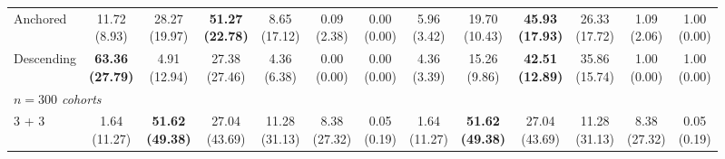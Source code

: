 {\begin{tabular}{l|cccccc|cccccc}
Anchored & \makecell{11.72 \\ (8.93)} & \makecell{28.27 \\ (19.97)} & {\cellcolor[HTML]{C8E6C9}} \bfseries \makecell{51.27 \\ (22.78)} & \makecell{8.65 \\ (17.12)} & \makecell{0.09 \\ (2.38)} & \makecell{0.00 \\ (0.00)} & \makecell{5.96 \\ (3.42)} & \makecell{19.70 \\ (10.43)} & {\cellcolor[HTML]{C8E6C9}} \bfseries \makecell{45.93 \\ (17.93)} & \makecell{26.33 \\ (17.72)} & \makecell{1.09 \\ (2.06)} & \makecell{1.00 \\ (0.00)} \\
Descending & \bfseries \makecell{63.36 \\ (27.79)} & \makecell{4.91 \\ (12.94)} & {\cellcolor[HTML]{C8E6C9}} \makecell{27.38 \\ (27.46)} & \makecell{4.36 \\ (6.38)} & \makecell{0.00 \\ (0.00)} & \makecell{0.00 \\ (0.00)} & \makecell{4.36 \\ (3.39)} & \makecell{15.26 \\ (9.86)} & {\cellcolor[HTML]{C8E6C9}} \bfseries \makecell{42.51 \\ (12.89)} & \makecell{35.86 \\ (15.74)} & \makecell{1.00 \\ (0.00)} & \makecell{1.00 \\ (0.00)} \\
\midrule
\multicolumn{13}{l}{\emph{$n = 300$ cohorts}} \\
3 + 3 & \makecell{1.64 \\ (11.27)} & \bfseries \makecell{51.62 \\ (49.38)} & {\cellcolor[HTML]{C8E6C9}} \makecell{27.04 \\ (43.69)} & \makecell{11.28 \\ (31.13)} & \makecell{8.38 \\ (27.32)} & \makecell{0.05 \\ (0.19)} & \makecell{1.64 \\ (11.27)} & \bfseries \makecell{51.62 \\ (49.38)} & {\cellcolor[HTML]{C8E6C9}} \makecell{27.04 \\ (43.69)} & \makecell{11.28 \\ (31.13)} & \makecell{8.38 \\ (27.32)} & \makecell{0.05 \\ (0.19)} \\

\end{tabular}}
